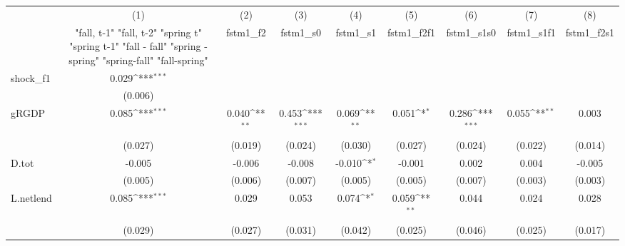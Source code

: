 {
\def\sym#1{\ifmmode^{#1}\else\(^{#1}\)\fi}
\begin{tabular}{l*{8}{c}}
\toprule
            &\multicolumn{1}{c}{(1)}&\multicolumn{1}{c}{(2)}&\multicolumn{1}{c}{(3)}&\multicolumn{1}{c}{(4)}&\multicolumn{1}{c}{(5)}&\multicolumn{1}{c}{(6)}&\multicolumn{1}{c}{(7)}&\multicolumn{1}{c}{(8)}\\
            &\multicolumn{1}{c}{  "fall, t-1" "fall, t-2" "spring t" "spring t-1"  "fall - fall" "spring - spring" "spring-fall" "fall-spring" }&\multicolumn{1}{c}{fstm1\_f2}&\multicolumn{1}{c}{fstm1\_s0}&\multicolumn{1}{c}{fstm1\_s1}&\multicolumn{1}{c}{fstm1\_f2f1}&\multicolumn{1}{c}{fstm1\_s1s0}&\multicolumn{1}{c}{fstm1\_s1f1}&\multicolumn{1}{c}{fstm1\_f2s1}\\
\midrule
shock\_f1    &       0.029\sym{***}&                     &                     &                     &                     &                     &                     &                     \\
            &     (0.006)         &                     &                     &                     &                     &                     &                     &                     \\
\addlinespace
gRGDP       &       0.085\sym{***}&       0.040\sym{**} &       0.453\sym{***}&       0.069\sym{**} &       0.051\sym{*}  &       0.286\sym{***}&       0.055\sym{**} &       0.003         \\
            &     (0.027)         &     (0.019)         &     (0.024)         &     (0.030)         &     (0.027)         &     (0.024)         &     (0.022)         &     (0.014)         \\
\addlinespace
D.tot       &      -0.005         &      -0.006         &      -0.008         &      -0.010\sym{*}  &      -0.001         &       0.002         &       0.004         &      -0.005         \\
            &     (0.005)         &     (0.006)         &     (0.007)         &     (0.005)         &     (0.005)         &     (0.007)         &     (0.003)         &     (0.003)         \\
\addlinespace
L.netlend   &       0.085\sym{***}&       0.029         &       0.053         &       0.074\sym{*}  &       0.059\sym{**} &       0.044         &       0.024         &       0.028         \\
            &     (0.029)         &     (0.027)         &     (0.031)         &     (0.042)         &     (0.025)         &     (0.046)         &     (0.025)         &     (0.017)         \\

\end{tabular}}
